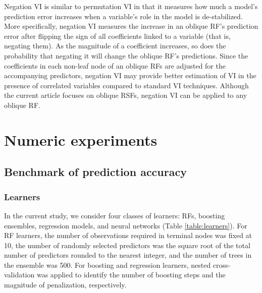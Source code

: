 \documentclass[twoside,11pt]{article}\usepackage[]{graphicx}\usepackage[]{xcolor}
\newcommand{\ie}{that is}
\begin{document}
Negation VI is similar to permutation VI in that it measures how much a model’s prediction error increases when a variable’s role in the model is de-stabilized. More specifically, negation VI measures the increase in an oblique RF's prediction error after flipping the sign of all coefficients linked to a variable (\ie, negating them). As the magnitude of a coefficient increases, so does the probability that negating it will change the oblique RF's predictions. Since the coefficients in each non-leaf node of an oblique RFs are adjusted for the accompanying predictors, negation VI may provide better estimation of VI in the presence of correlated variables compared to standard VI techniques. Although the current article focuses on oblique RSFs, negation VI can be applied to any oblique RF.

\section{Numeric experiments}

\subsection{Benchmark of prediction accuracy}

\subsubsection{Learners}

In the current study, we consider four classes of learners: RFs, boosting ensembles, regression models, and neural networks (Table \ref{table:learners}). For RF learners, the number of observations required in terminal nodes was fixed at 10, the number of randomly selected predictors was the square root of the total number of predictors rounded to the nearest integer, and the number of trees in the ensemble was 500. For boosting and regression learners, nested cross-validation was applied to identify the number of boosting steps and the magnitude of penalization, respectively.
\end{document}
